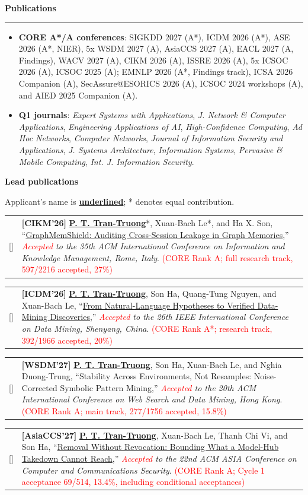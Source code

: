 \documentclass[11pt,a4paper]{article}
\makeatletter
\newcommand{\sectiontitle}[1]{%
  \Needspace{5\baselineskip}
  \vspace{0.28cm}%
  {\Large\bfseries #1}\par\vspace{0.08cm}\hrule\vspace{0.18cm}%
}
\newcounter{pubcounter}
\newcommand{\pubentry}[2]{%
  \stepcounter{pubcounter}%
  \vspace{0.045cm}
  \noindent\small\linespread{0.97}\selectfont\begin{tabularx}{\textwidth}{@{}p{0.78cm}@{}X@{}}
  [\thepubcounter] & #2
  \end{tabularx}
  \normalsize
}
\newcommand{\subpubheading}[1]{%
  \Needspace{5\baselineskip}
  \vspace{0.10cm}\par{\bfseries #1}\par\vspace{0.02cm}\nopagebreak[4]%
}
\newcommand{\me}{\underline{\textbf{P. T. Tran-Truong}}}
\makeatother
\begin{document}
\sectiontitle{Publications}
\begin{itemize}
  \item \textbf{CORE A*/A conferences}: SIGKDD 2027 (A*), ICDM 2026 (A*), ASE 2026 (A*, NIER), 5x WSDM 2027 (A), AsiaCCS 2027 (A), EACL 2027 (A, Findings), WACV 2027 (A), CIKM 2026 (A), ISSRE 2026 (A), 5x ICSOC 2026 (A), ICSOC 2025 (A); EMNLP 2026 (A*, Findings track), ICSA 2026 Companion (A), SecAssure@ESORICS 2026 (A), ICSOC 2024 workshops (A), and AIED 2025 Companion (A).
  \item \textbf{Q1 journals}: \textit{Expert Systems with Applications}, \textit{J. Network \& Computer Applications}, \textit{Engineering Applications of AI}, \textit{High-Confidence Computing}, \textit{Ad Hoc Networks}, \textit{Computer Networks}, \textit{Journal of Information Security and Applications}, \textit{J. Systems Architecture}, \textit{Information Systems}, \textit{Pervasive \& Mobile Computing}, \textit{Int. J. Information Security}.
\end{itemize}

\subpubheading{Lead publications}
{\small Applicant's name is \underline{\textbf{underlined}}; * denotes equal contribution.}

\vspace{0.12cm}
\pubentry{2026}{\textbf{[CIKM'26]} \me*, Xuan-Bach Le*, and Ha X. Son, ``\href{https://drive.google.com/file/d/1sWQzD7oXUJJimC\_JQG\_ABYKI7Z8WPfrm/view?usp=sharing}{GraphMemShield: Auditing Cross-Session Leakage in Graph Memories},'' \textit{\textcolor{red}{Accepted} to the 35th ACM International Conference on Information and Knowledge Management, Rome, Italy}. \textcolor{red}{(CORE Rank A; full research track, 597/2216 accepted, 27\%)}}

\pubentry{2026}{\textbf{[ICDM'26]} \me, Son Ha, Quang-Tung Nguyen, and Xuan-Bach Le, ``\href{https://drive.google.com/file/d/1IBgIK8Lyibf76n4FMg\_w81IpcrzArCyB/view?usp=sharing}{From Natural-Language Hypotheses to Verified Data-Mining Discoveries},'' \textit{\textcolor{red}{Accepted} to the 26th IEEE International Conference on Data Mining, Shenyang, China}. \textcolor{red}{(CORE Rank A*; research track, 392/1966 accepted, 20\%)}}

\hypertarget{wsdm-acceptance}{}
\pubentry{2027}{\textbf{[WSDM'27]} \me, Son Ha, Xuan-Bach Le, and Nghia Duong-Trung, ``Stability Across Environments, Not Resamples: Noise-Corrected Symbolic Pattern Mining,'' \textit{\textcolor{red}{Accepted} to the 20th ACM International Conference on Web Search and Data Mining, Hong Kong}. \textcolor{red}{(CORE Rank A; main track, 277/1756 accepted, 15.8\%)}}
\pubentry{2027}{\textbf{[AsiaCCS'27]} \me, Xuan-Bach Le, Thanh Chi Vi, and Son Ha, ``\href{https://leotttphat.github.io/publications/\#removal-without-revocation}{Removal Without Revocation: Bounding What a Model-Hub Takedown Cannot Reach},'' \textit{\textcolor{red}{Accepted} to the 22nd ACM ASIA Conference on Computer and Communications Security}. \textcolor{red}{(CORE Rank A; Cycle 1 acceptance 69/514, 13.4\%, including conditional acceptances)}}
\end{document}
